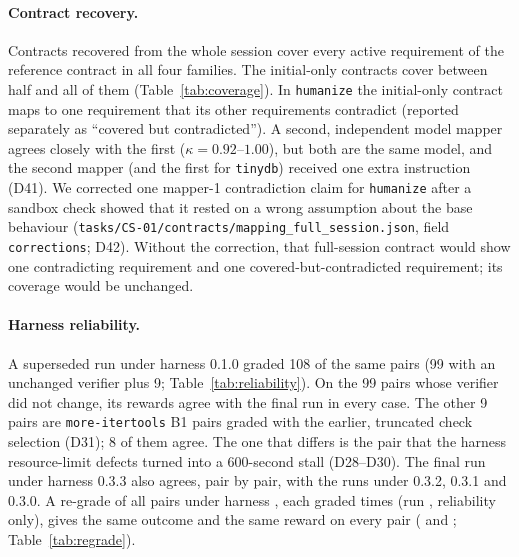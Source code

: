 \paragraph{Contract recovery.} Contracts recovered from the whole session cover every active requirement of the reference contract in all four families. The initial-only contracts cover between half and all of them (Table~\ref{tab:coverage}). In \texttt{humanize} the initial-only contract maps to one requirement that its other requirements contradict (reported separately as ``covered but contradicted''). A second, independent model mapper agrees closely with the first ($\kappa = 0.92$--$1.00$), but both are the same model, and the second mapper (and the first for \texttt{tinydb}) received one extra instruction (D41). We corrected one mapper-1 contradiction claim for \texttt{humanize} after a sandbox check showed that it rested on a wrong assumption about the base behaviour (\texttt{tasks/CS-01/contracts/mapping\_full\_session.json}, field \texttt{corrections}; D42). Without the correction, that full-session contract would show one contradicting requirement and one covered-but-contradicted requirement; its coverage would be unchanged.

\paragraph{Harness reliability.} A superseded run under harness 0.1.0 graded 108 of the same pairs (99 with an unchanged verifier plus 9; Table~\ref{tab:reliability}). On the 99 pairs whose verifier did not change, its rewards agree with the final run in every case. The other 9 pairs are \texttt{more-itertools} B1 pairs graded with the earlier, truncated check selection (D31); 8 of them agree. The one that differs is the pair that the harness resource-limit defects turned into a 600-second stall (D28--D30). The final run under harness 0.3.3 also agrees, pair by pair, with the runs under 0.3.2, 0.3.1 and 0.3.0. A re-grade of all  pairs under harness , each graded  times (run \texttt{\REGRADERUN}, reliability only), gives the same outcome and the same reward on every pair ( and ; Table~\ref{tab:regrade}).
